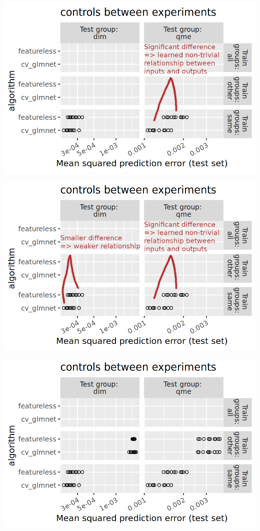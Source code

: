 \documentclass{beamer}
\begin{document}
\begin{frame}
  \includegraphics[width=\textwidth]{qsip_pc2_all_new-controls.between.experiments.same.ann.png}
\end{frame}

\begin{frame}
  \includegraphics[width=\textwidth]{qsip_pc2_all_new-controls.between.experiments.same.ann2.png}
\end{frame}

\begin{frame}
  \includegraphics[width=\textwidth]{qsip_pc2_all_new-controls.between.experiments.other.png}
\end{frame}
\end{document}
